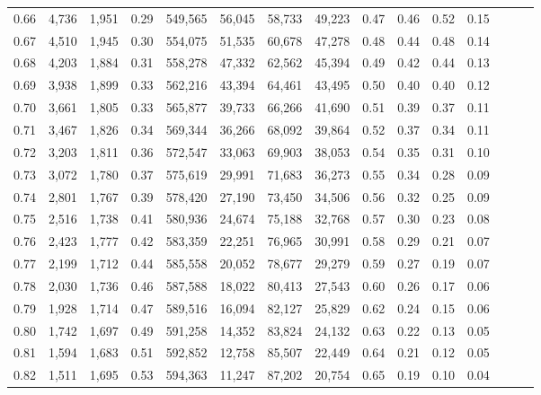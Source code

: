 \begin{tabular}{rrrrrrrrrrrrrrr}
0.66 &   4,736 &  1,951 &  0.29 &  549,565 &   56,045 &   58,733 &   49,223 &  0.47 &  0.46 &  0.52 &      0.15 \\
0.67 &   4,510 &  1,945 &  0.30 &  554,075 &   51,535 &   60,678 &   47,278 &  0.48 &  0.44 &  0.48 &      0.14 \\
0.68 &   4,203 &  1,884 &  0.31 &  558,278 &   47,332 &   62,562 &   45,394 &  0.49 &  0.42 &  0.44 &      0.13 \\
0.69 &   3,938 &  1,899 &  0.33 &  562,216 &   43,394 &   64,461 &   43,495 &  0.50 &  0.40 &  0.40 &      0.12 \\
0.70 &   3,661 &  1,805 &  0.33 &  565,877 &   39,733 &   66,266 &   41,690 &  0.51 &  0.39 &  0.37 &      0.11 \\
0.71 &   3,467 &  1,826 &  0.34 &  569,344 &   36,266 &   68,092 &   39,864 &  0.52 &  0.37 &  0.34 &      0.11 \\
0.72 &   3,203 &  1,811 &  0.36 &  572,547 &   33,063 &   69,903 &   38,053 &  0.54 &  0.35 &  0.31 &      0.10 \\
0.73 &   3,072 &  1,780 &  0.37 &  575,619 &   29,991 &   71,683 &   36,273 &  0.55 &  0.34 &  0.28 &      0.09 \\
0.74 &   2,801 &  1,767 &  0.39 &  578,420 &   27,190 &   73,450 &   34,506 &  0.56 &  0.32 &  0.25 &      0.09 \\
0.75 &   2,516 &  1,738 &  0.41 &  580,936 &   24,674 &   75,188 &   32,768 &  0.57 &  0.30 &  0.23 &      0.08 \\
0.76 &   2,423 &  1,777 &  0.42 &  583,359 &   22,251 &   76,965 &   30,991 &  0.58 &  0.29 &  0.21 &      0.07 \\
0.77 &   2,199 &  1,712 &  0.44 &  585,558 &   20,052 &   78,677 &   29,279 &  0.59 &  0.27 &  0.19 &      0.07 \\
0.78 &   2,030 &  1,736 &  0.46 &  587,588 &   18,022 &   80,413 &   27,543 &  0.60 &  0.26 &  0.17 &      0.06 \\
0.79 &   1,928 &  1,714 &  0.47 &  589,516 &   16,094 &   82,127 &   25,829 &  0.62 &  0.24 &  0.15 &      0.06 \\
0.80 &   1,742 &  1,697 &  0.49 &  591,258 &   14,352 &   83,824 &   24,132 &  0.63 &  0.22 &  0.13 &      0.05 \\
0.81 &   1,594 &  1,683 &  0.51 &  592,852 &   12,758 &   85,507 &   22,449 &  0.64 &  0.21 &  0.12 &      0.05 \\
0.82 &   1,511 &  1,695 &  0.53 &  594,363 &   11,247 &   87,202 &   20,754 &  0.65 &  0.19 &  0.10 &      0.04 \\

\end{tabular}
